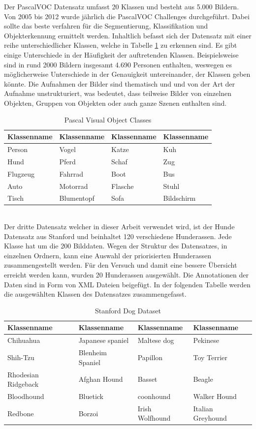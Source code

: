 \documentclass[a4paper,12pt,oneside]{article}
\begin{document}
Der PascalVOC Datensatz umfasst 20 Klassen und besteht aus 5.000 Bildern. Von 2005 bis 2012 wurde jährlich die PascalVOC Challenges durchgeführt. Dabei sollte das beste verfahren für die Segmentierung, Klassifikation und Objekterkennung ermittelt werden. Inhaltlich befasst sich der Datensatz mit einer reihe unterschiedlicher Klassen, welche in Tabelle \ref{tab:pvoc} zu erkennen sind. Es gibt einige Unterschiede in der Häufigkeit der auftretenden Klassen. Beispielsweise sind in rund 2000 Bildern insgesamt 4.690 Personen enthalten, weswegen es möglicherweise Unterschiede in der Genauigkeit untereinander, der Klassen geben könnte. Die Aufnahmen der Bilder sind thematisch und und von der Art der Aufnahme unstrukturiert, was bedeutet, dass teilweise Bilder von einzelnen Objekten, Gruppen von Objekten oder auch ganze Szenen enthalten sind.\\
\begin{table}
[h]
\caption{Pascal Visual Object Classes \cite{pascal-voc-2007}}
\centering
\begin{tabular}{|l|l|l|l|}
\hline
Klassenname & Klassenname & Klassenname & Klassenname\\
\hline
Person & Vogel & Katze & Kuh\\
Hund & Pferd & Schaf & Zug\\
Flugzeug & Fahrrad & Boot & Bus\\
Auto & Motorrad & Flasche & Stuhl\\
Tisch & Blumentopf & Sofa & Bildschirm\\
\hline
\end{tabular}
\label{tab:pvoc}
\end{table}\\
Der dritte Datensatz welcher in dieser Arbeit verwendet wird, ist der Hunde Datensatz aus Stanford und beinhaltet 120 verschiedene Hunderassen. Jede Klasse hat um die 200 Bilddaten. Wegen der Struktur des Datensatzes, in einzelnen Ordnern, kann eine Auswahl der priorisierten Hunderassen zusammengestellt werden. Für den Versuch und damit eine bessere Übersicht erreicht werden kann, wurden 20 Hunderassen ausgewählt. Die Annotationen der Daten sind in Form von XML Dateien beigefügt. In der folgenden Tabelle werden die ausgewählten Klassen des Datensatzes zusammengefasst.\\
\begin{table}
[h]
\caption{Stanford Dog Dataset \cite{KhoslaYaoJayadevaprakashFeiFei_FGVC2011}}
\centering
\begin{tabular}{|l|l|l|l|}
\hline
Klassenname & Klassenname & Klassenname & Klassenname\\
\hline
Chihuahua & Japanese spaniel & Maltese dog & Pekinese\\
Shih-Tzu & Blenheim Spaniel & Papillon & Toy Terrier\\
Rhodesian Ridgeback & Afghan Hound & Basset & Beagle\\
Bloodhound & Bluetick & coonhound & Walker Hound\\
Redbone & Borzoi & Irish Wolfhound & Italian Greyhound\\
\hline
\end{tabular}
\end{table}\\
\end{document}
